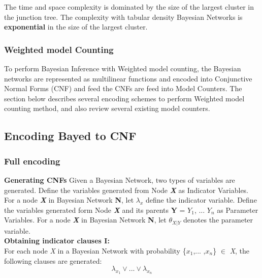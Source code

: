         \noindent The time and space complexity is dominated by the size of the largest cluster in the junction tree. The complexity with tabular density Bayesian Networks is \textbf{exponential} in the size of the largest cluster.
        
        
        \subsubsection{Weighted model Counting}
        To perform Bayesian Inference with Weighted model counting, the Bayesian networks are represented as multi\-linear functions and encoded into Conjunctive Normal Forms (CNF) and feed the CNFs are feed into Model Counters. The section below describes several encoding schemes to perform Weighted model counting method, and also review several existing model counters.
    
    \subsection{Encoding Bayed to CNF}
        \subsubsection{Full encoding}
            \textbf{Generating CNFs}
            \newline
            Given a Bayesian Network, two types of variables are generated.
            Define the variables generated from Node \textbf{\textit{X}} as Indicator Variables.
            For a node \textbf{\textit{X}} in Bayesian Network \textbf{N}, let $\lambda_x$ define the indicator variable. 
            Define the variables generated form Node \textbf{\textit{X}} and its parents \textbf{Y} = {$Y_{1}$, ... $Y_{n}$} as Parameter Variables.
            For a node \textbf{\textit{X}} in Bayesian Network \textbf{N}, let $\theta_{X|Y}$ denotes the parameter variable.\\
            
            \noindent \textbf{Obtaining indicator clauses \textsc{I}:}\\
            For each node \textit{X} in a Bayesian Network with probability \{$x_{1}$,... ,$x_{n}$\} $\in$ \textit{X}, the following clauses are generated:
            \begin{equation}\label{fullenc_ic1}
                \lambda_{x_{1}} \vee ... \vee \lambda_{x_{n}}
            \end{equation}
            
